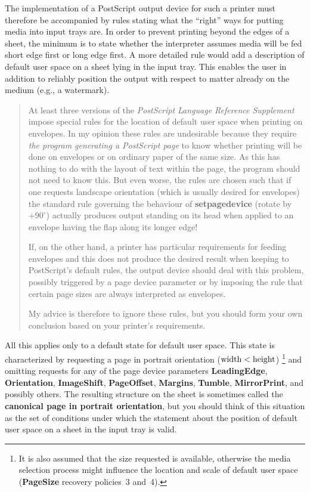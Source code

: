 \documentclass[twoside,a4paper]{article}
\newenvironment{note}{\begin{quote}\small}{\end{quote}}
\newcommand{\ps}[1]{{\sffamily\bfseries #1}}	%
\renewcommand{\d}[1]{{\bfseries #1}}	%
\begin{document}
The implementation of a PostScript output device for such a printer must
therefore be accompanied by rules stating what the ``right'' ways for putting
media into input trays are.
In order to prevent printing beyond the edges of a sheet,
the minimum is to state whether the interpreter assumes media will be fed short
edge first or long edge first.
A more detailed rule would add a description of default user space on
a sheet lying in the input tray.
This enables the user in addition to reliably position the output with respect
to matter already on the medium (e.g., a watermark).

\begin{note}
  At least three versions of the {\it PostScript Language Reference
  Supplement\/}~\cite{PSSupplement2017,PSSupplement3010,PSSupplement3011}
  impose special rules
  for the location of default user space when printing on envelopes.
  In my opinion these rules are undesirable because they require
  \textit{the program generating a PostScript page\/} to know
  whether printing will be done on envelopes or on ordinary paper
  of the same size.
  As this has nothing to do with the layout of text within the page,
  the program should not need to know this.
  But even worse, the rules are chosen such that if one requests landscape
  orientation (which is usually desired for envelopes) the standard rule
  governing the behaviour of \ps{setpagedevice} (rotate by $+90^\circ$)
  actually produces output standing on its head when applied to an envelope
  having the flap along its longer edge!
  
  If, on the other hand, a printer has particular requirements for feeding
  envelopes and this does not produce the desired result when keeping to
  PostScript's default rules,
  the output device should deal with this problem, possibly triggered by a
  page device parameter or by imposing the rule that certain page sizes are
  always interpreted as envelopes.

  My advice is therefore to ignore these rules,
  but you should form your own conclusion based on your printer's requirements.
\end{note}

All this applies only to a default state for default user space.
This state is characterized by requesting a page in portrait orientation
($\hbox{width} < \hbox{height}$)%
  \footnote{It is also assumed that the size requested is available,
    otherwise the media selection process might influence the location and
    scale of default user space (\ps{PageSize} recovery policies~3 and~4).}
and omitting requests for any of the page device parameters
\ps{LeadingEdge}, \ps{Orientation}, \ps{ImageShift},
\ps{PageOffset}, \ps{Margins}, \ps{Tumble}, \ps{MirrorPrint},
and possibly others.
The resulting structure on the sheet is sometimes called the
\d{canonical page in portrait orientation},
but you should think of this situation as the set of conditions
under which the statement about the position of default user space
on a sheet in the input tray is valid.
\end{document}
